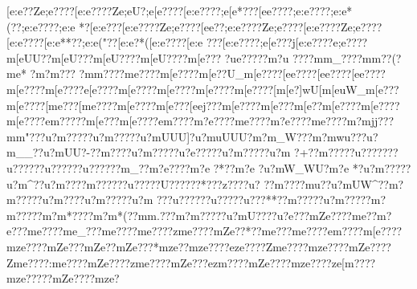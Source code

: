 {{{{{{{{{{{{{{{{{{{{{{{{{{{{{{{{{{{{{{{{{{{{{{{{{{{{{{{{{{{{{{{{{{{{{{{{{{{{{{{{{{{{{{{{{{{{{{{{{{{{{{{{{{{{{{{{{{{{{{{{{{{{{{{{{{{{{{{{{{{{{{{{{{{{{{{{{{{{{{{{{{{{{{{{{{{{{{{{{{{{{{{{{{{{{{{{{{{{{{{{{{{{{{{{{{{{{{{{{{{{{{{{{{{{{{{{{{{{{{{{{{{{{{{{{{{{{{{{{{{{{{{{{{{{{{{{{{{{{{{{{{{{{{{{{{{{{{{{{{{{{{{{{{{{{{{{{{{{{{{{{{{{{{{{{{{{{{{{{{{{{{{{{{{{{{{{{{{{{{{{{{{{{{{{{{{{{{{{{{{{{{{{{{{{{{{{{{{{{{{{{{{{{{{{{{{{{{{{{{{{{{{{{{{{{{{{{{{{{{{{{{{{{{{{{{{{{{{{{{{{{{{{{{{{{{{{{{{{{{{{{{{{{{{{{{{{{{{{{{{{{{{{{{{{{{{{{{{{{{{{{{{{{{{{{{{{{{{{{{{{{{{{{{{{{{{{{{{{{{{{{{{{{{{{{{{{{{{{{{{{{{{{{{{{{{{{{{{{{{{{{{{{{{{{{{{{{{{{{{{{{{{{{{{{{{{{{{{{{{{{{{{{{{{{{{{{{{{{{{{{{{{{{{{{{{{{{{{{{{{{{{{{{{{{{{{{{{{{{{{{{{{{{{{{{{{{{{{{{{{{{{{{{{{{{{{{{{{{{{{{{{{{{{{{{{{{{{{{{{{{{{{{{{{{{{{{{{{{{{{{{{{{{{{{{{{{{{{{{{{{{{{{{{{{{{{{{{{{{{{{{{{{{{{{{{{{{{{{{{{{{{{{{{{{{{{{{{{{{{{{{{{{{{{{{{{{{{{{{{{{{{{{{{{{{{{{{{{{{{{{{{{{{{{{{{{{{{{{{{{{{{{{{{{{{{{{{{{{{{{{{{{{{{{{{{{{{{{{{{{{{{{{{{{{{{{{{{{{{{{{{{{{{{{{{{{{{{{{{{{{{{{{{{[e:e??Ze;e????[e:e????Ze;eU}?;e[e????[e:e????;e[e*???[ee????;e:e????;e:e*(??;e:e????;e:e
 *?[e:e???[e:e????Ze;e????[ee??;e:e????Ze;e????[e:e????Ze;e????[e:e????[e:e**??;e:e("??[e:e?*([e:e????[e:e ???[e:e????;e[e???j[e:e????{e;e????{m[eUU??{m[eU???m[eU????m[eU????m[e???
?u{e?????m?u
????m{m_????m{m??( ?m{e*
 ?m?m???
?m{m????m{e????m[e????{m[e??U_{m[e????[e{e????[e{e????[e{e????{m[e????{m[e????{e[e????{m[e????{m[e????{m[e????{m[e????[m[e?]wU[m[euW_{m[e???{m[e????[m{e???[m{e????{m[e????{m[e???[e{ej???{m[e????{m[e???{m[e??{m[e????{m[e????{m[e????{e{m?????m[e???m[e????{e{m????{m?e????m{e????{m?e????{m{e????{m?mjj???m{m"???u?m?????u?m?????u?mUUU]?u?muUUU?m?m_W???m?mwu???u?m__??u?mUU?-?}?m????u?m?????u?e?????u?m?????u?m 
?+?}?m?????u?}?????}?u?????}?u?????}?u?????}?m_??m?e??? ?m?e ?*??m?e   
?u?mW_WU?m?e
* ?u?m?????u?m{^??u?m???}?m?????}?u??? ??}U??????}*   ???}z?  ???u?  ?}?m?? ?}?mu??u?mUW^??m?m?????u?m????u?m?????u?m 
??}?u?????}?u?????u?}??**?}?m?????u?m?????m?m?????m?m*????m?m*(??m{m.?? ?m?m?????u?mU????u?e???mZe ????m{e??{m?e???m{e????{m{e_???m{e????{m{e????zm{e????{mZe??*??m{e???{m{e????{e{m????{m[e????{mze????{mZe???{mZe??{mZe???*{mze??{mze????{eze????Zm{e????{mze????{mZe????Zm{e????:m{e????{mZe????zm{e????{mZe???{ezm????{mZe????{mze????ze[m????{mze?????mZe????{mze?
}}}}}}}}}}}}}}}}}}}}}}}}}}}}}}}}}}}}}}}}}}}}}}}}}}}}}}}}}}}}}}}}}}}}}}}}}}}}}}}}}}}}}}}}}}}}}}}}}}}}}}}}}}}}}}}}}}}}}}}}}}}}}}}}}}}}}}}}}}}}}}}}}}}}}}}}}}}}}}}}}}}}}}}}}}}}}}}}}}}}}}}}}}}}}}}}}}}}}}}}}}}}}}}}}}}}}}}}}}}}}}}}}}}}}}}}}}}}}}}}}}}}}}}}}}}}}}}}}}}}}}}}}}}}}}}}}}}}}}}}}}}}}}}}}}}}}}}}}}}}}}}}}}}}}}}}}}}}}}}}}}}}}}}}}}}}}}}}}}}}}}}}}}}}}}}}}}}}}}}}}}}}}}}}}}}}}}}}}}}}}}}}}}}}}}}}}}}}}}}}}}}}}}}}}}}}}}}}}}}}}}}}}}}}}}}}}}}}}}}}}}}}}}}}}}}}}}}}}}}}}}}}}}}}}}}}}}}}}}}}}}}}}}}}}}}}}}}}}}}}}}}}}}}}}}}}}}}}}}}}}}}}}}}}}}}}}}}}}}}}}}}}}}}}}}}}}}}}}}}}}}}}}}}}}}}}}}}}}}}}}}}}}}}}}}}}}}}}}}}}}}}}}}}}}}}}}}}}}}}}}}}}}}}}}}}}}}}}}}}}}}}}}}}}}}}}}}}}}}}}}}}}}}}}}}}}}}}}}}}}}}}}}}}}}}}}}}}}}}}}}}}}}}}}}}}}}}}}}}}}}}}}}}}}}}}}}}}}}}}}}}}}}}}}}}}}}}}}}}}}}}}}}}}}}}}}}}}}}}}}}}}}}}}}}}}}}}}}}}}}}}}}}}}}}}}}}}}}}}}}}}}}}}}}}}}}}}}}}}}}}}}}}}}}}}}}}}}}}}}}}}}}}}}}}}}}}}}}}}}}}}}}}}}}}}}}}}}}}}}}}}}}}}}}}}}}}}}}}}}}}}}}}}}}}}}}}}}}}}}}}}}}}}}}}}}}}}}}}}}}}}}}}}}}}}}}}}}}}}}}}}}}}}}}}}}}}}}}}}}}}}}}}}}}}}}}}}}}}}}}}}}}}}}}}}}}}}}}}}}}}}}}}}}}}}}}}}}}}}}}}}}}}}}}}}
